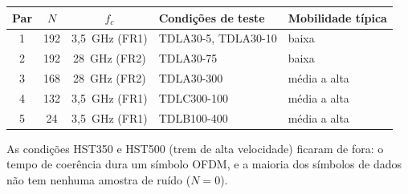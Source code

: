 \documentclass[11pt]{article}
\begin{document}
\begin{center}
\small
\renewcommand{\arraystretch}{1.15}
\begin{tabular}{|c|c|c|l|l|}
\hline
Par & $N$ & $f_c$ & Condições de teste & Mobilidade típica \\
\hline
1 & 192 & 3,5~GHz (FR1) & TDLA30-5, TDLA30-10 & baixa \\
2 & 192 & 28~GHz (FR2)  & TDLA30-75           & baixa \\
3 & 168 & 28~GHz (FR2)  & TDLA30-300          & média a alta \\
4 & 132 & 3,5~GHz (FR1) & TDLC300-100         & média a alta \\
5 & 24  & 3,5~GHz (FR1) & TDLB100-400         & média a alta \\
\hline
\end{tabular}
\end{center}

As condições HST350 e HST500 (trem de alta velocidade) ficaram de fora: o tempo de coerência
dura um símbolo OFDM, e a maioria dos símbolos de dados não tem nenhuma amostra de ruído
($N = 0$).
\end{document}
